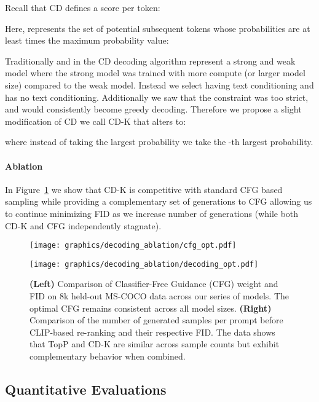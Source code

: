 \documentclass{article}
\begin{document}
Recall that CD defines a score per token:

Here,  represents the set of potential subsequent tokens whose probabilities are at least  times the maximum probability value:


Traditionally  and  in the CD decoding algorithm represent a strong and weak model where the strong model was trained with more compute (or larger model size) compared to the weak model. Instead we select  having text conditioning and  has no text conditioning. Additionally we saw that the  constraint was too strict, and would consistently become greedy decoding. Therefore we propose a slight modification of CD we call CD-K that alters  to:

where instead of taking the largest probability we take the -th largest probability.

\paragraph{Ablation}

In Figure~\ref{fig:cfg_dec_strat} we show that CD-K is competitive with standard CFG based sampling while providing a complementary set of generations to CFG allowing us to continue minimizing FID as we increase number of generations (while both CD-K and CFG independently stagnate).
\begin{figure}[htbp]
  \centering
  \begin{minipage}[b]{0.49\textwidth}
    \centering
    \texttt{[image: graphics/decoding\_ablation/cfg\_opt.pdf]}
  \end{minipage}
  \hfill
  \begin{minipage}[b]{0.49\textwidth}
    \centering
    \texttt{[image: graphics/decoding\_ablation/decoding\_opt.pdf]}
  \end{minipage}
  \caption{ \textbf{(Left)} Comparison of Classifier-Free Guidance (CFG) weight and FID on 8k held-out MS-COCO data across our series of models. The optimal CFG remains consistent across all model sizes. \textbf{(Right)} Comparison of the number of generated samples per prompt before CLIP-based re-ranking and their respective FID. The data shows that TopP and CD-K are similar across sample counts but exhibit complementary behavior when combined.}\label{fig:cfg_dec_strat}
\end{figure}

\subsection{Quantitative Evaluations}
\end{document}
